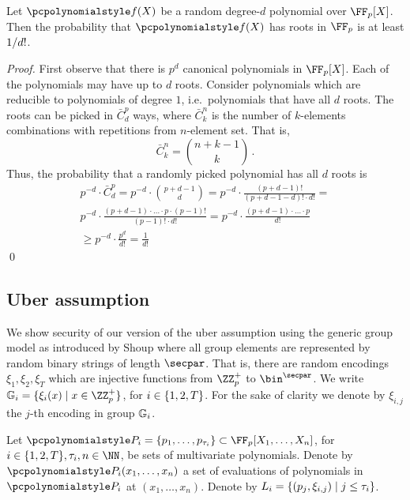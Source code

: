 \documentclass[runningheads,11pt]{llncs}
\begin{document}
\begin{lemma}
  \label{lem:root_prob}
  Let $\p{f}(X)$ be a random degree-$d$ polynomial over $\FF_p[X]$. Then the
  probability that $\p{f}(X)$ has roots in $\FF_p$ is at least $1 / d!$.
\end{lemma}
\begin{proof}
  First observe that there is $p^{d}$ canonical polynomials in $\FF_p[X]$.  Each
  of the polynomials may have up to $d$ roots. Consider polynomials which are
  reducible to polynomials of degree $1$, i.e.~polynomials that have all $d$
  roots. The roots can be picked in $\bar{C}^{p}_{d}$ ways, where
  $\bar{C}^{n}_{k}$ is the number of $k$-elements combinations with repetitions
  from $n$-element set. That is,
  \[
    \bar{C}^n_k = \binom{n + k - 1}{k}\,.
  \]
  Thus, the probability that a randomly picked polynomial has all $d$ roots is
  \begin{multline*}
    p^{-d} \cdot \bar{C}^p_d = p^{-d} \cdot \binom{p + d - 1}{d} =
    p^{-d} \cdot \frac{(p + d - 1)!}{(p + d - 1 - d)! \cdot d!} = \\
    p^{-d} \cdot \frac{(p + d - 1) \cdot \ldots \cdot p \cdot (p - 1)!}{(p - 1)!
      \cdot d!} = p^{-d} \cdot \frac{(p + d - 1)\cdot
      \ldots \cdot p}{d!} \\
    \geq p^{-d} \cdot {\frac{p^d}{d!}} = \frac{1}{d!}
  \end{multline*}
  \qed
\end{proof}

\subsection{Uber assumption}
\label{sec:uber_assumption}
We show security of our version of the uber assumption using the generic group
model as introduced by Shoup \cite{EC:Shoup97} where all group elements are
represented by random binary strings of length $\secpar$. That is, there are
random encodings $\xi_1, \xi_2, \xi_T$ which are injective functions from
$\ZZ_p^+$ to $\bin^{\secpar}$. We write
$\GRP_i = \smallset{\xi_i(x) \mid x \in \ZZ_p^+}$, for
$i \in \{1, 2, T\}$. For the sake of clarity  we denote by $\xi_{i, j}$
the $j$-th encoding in group $\mathbb{G}_i$.

Let
$\p{P}_i = \smallset{p_1, \ldots, p_{\tau_i}} \subset \FF_p[X_1, \ldots, X_n]$,
for $i \in \smallset{1, 2, T}, \tau_i, n \in \NN$, be sets of multivariate
polynomials. Denote by $\p{P}_i(x_1, \ldots, x_n)$ a set of evaluations of
polynomials in $\p{P_i}$ at $(x_1, \ldots, x_n)$. Denote by
$L_i = \{(p_j, \xi_{i, j}) \mid j \leq \tau_i\}$.
\end{document}
